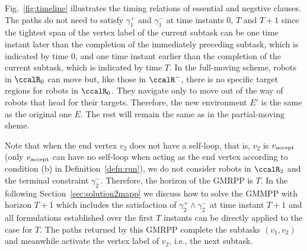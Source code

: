 \documentclass[Afour,sageh,times]{sagej}
\newcommand{\vertex}[1]{v_{\textup{#1}}}
\begin{document}
{ Fig.~\ref{fig:timeline} illustrates the timing relations of essential and negstive clauses.  The paths do not need to satisfy  $\gamma_1^+$ and $\gamma_1^-$ at time instants 0,  $T$ and $ T+1$ since the tightest span of the vertex label of the current subtask can be one time instant later than the completion of the immediately preceding subtask, which is indicated by time 0, and one time instant earlier than the completion of the current subtask, which is indicated by time $T$. In the full-moving scheme, robots in $\ccalR_0$ can move but, like those in $\ccalR^-$, there is no specific target regions for robots in $\ccalR_0$. They  navigate only to move out of the way of robots that head for their targets. Therefore, the new environment $E'$ is the same as the original one $E$. The rest will remain the same as in the partial-moving sheme.

 Note that when the end vertex $v_2$ does not have a self-loop, that is, $v_2$ is $\vertex{accept}$ (only $\vertex{accept}$ can have no self-loop when acting as the end vertex according to condition (b) in Definition~\ref{defn:run}), we do not consider robots in $\ccalR_2$ and the terminal constraint $\gamma_2^-$. Therefore, the horizon of the GMRPP is $T$. In the following Section~\ref{sec:solution2mapp} we discuss how to solve the GMMPP with horizon $T+1$ which  includes the satisfaction of $\gamma_2^+\wedge \gamma_2^-$ at time instant $T+1$ and all formulations established over the first $T$ instants can be directly applied to the case for $T$.  The paths returned by this GMRPP complete the subtasks $(v_1, v_2)$  and meanwhile activate the vertex label of $v_2$, i.e., the next subtask.



}
\end{document}
